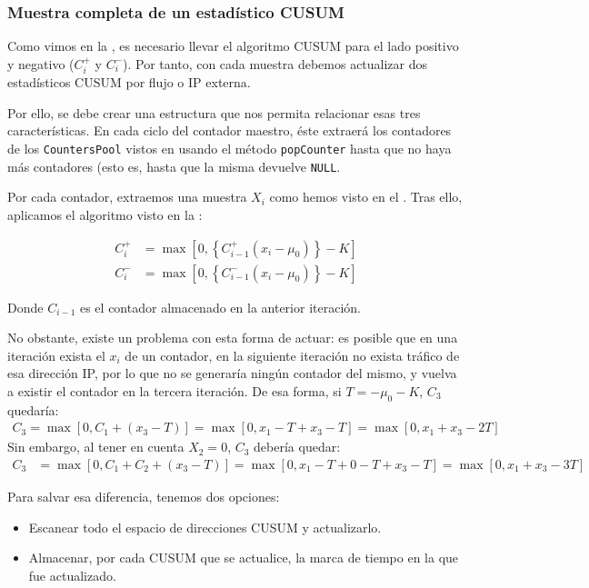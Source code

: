 \subsubsection{Muestra completa de un estadístico CUSUM}
Como vimos en la , es necesario llevar el algoritmo CUSUM para el lado positivo y negativo ($C_i^+$ 
y $C_i^-$). Por tanto, con cada muestra debemos actualizar dos estadísticos \gls{CUSUM} por flujo o \gls{IP} externa.

Por ello, se debe crear una estructura que nos permita relacionar esas tres características. En cada ciclo del contador 
maestro, éste extraerá los contadores de los \texttt{CountersPool} vistos en  usando el 
método \texttt{popCounter} hasta que no haya más contadores (esto es, hasta que la misma devuelve \texttt{NULL}.

Por cada contador, extraemos una muestra $X_i$ como hemos visto en el . Tras ello, 
aplicamos el algoritmo visto en la :

\begin{align}
 C_i^+ &= \max \left[0,\left\{C_{i-1}^+\left(x_i-\mu_0\right)\right\}-K\right] \\
 C_i^- &= \max \left[0,\left\{C_{i-1}^-\left(x_i-\mu_0\right)\right\}-K\right]
\end{align}

Donde $C_{i-1}$ es el contador almacenado en la anterior iteración.

No obstante, existe un problema con esta forma de actuar: es posible que en una iteración exista el $x_i$ de un 
contador, en la siguiente iteración no exista tráfico de esa dirección \gls{IP}, por lo que no se generaría ningún 
contador del mismo, y vuelva a existir el contador en la tercera iteración. De esa forma, si $T=-\mu_0-K$, $C_3$ 
quedaría:
\begin{align}
 C_3 = \max\left[0,C_1 + (x_3-T)\right] = \max\left[0,x_1-T+x_3-T\right] = 
       \max\left[0,x_1+x_3-2T\right] 
\end{align}
Sin embargo, al tener en cuenta $X_2=0$, $C_3$ debería quedar:
\begin{align}
 C_3 &= \max\left[0,C_1 + C_2 + (x_3-T)\right] = \max\left[0,x_1-T+0-T+x_3-T\right]
     =        \max\left[0,x_1 + x_3 -3T\right] 
\end{align}

Para salvar esa diferencia, tenemos dos opciones:
\begin{itemize}
 \item Escanear todo el espacio de direcciones CUSUM y actualizarlo.
 \item Almacenar, por cada CUSUM que se actualice, la marca de tiempo en la que fue actualizado.
\end{itemize}

